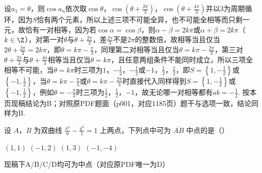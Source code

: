\begin{solution}
设\(a_{1}=\theta\)，则\(\cos a_{n}\)依次取\(\cos\theta\)，\(\cos\left(\theta+\frac{2\pi}{3}\right)\)，\(\cos\left(\theta+\frac{4\pi}{3}\right)\)并以\(3\)为周期循环，因为\(S\)恰有两个元素，所以上述三项不可能全异，也不可能全相等而只剩一元，故恰有一对相等，因为若\(\cos\alpha=\cos\beta\)，则\(\alpha-\beta=2k\pi\)或\(\alpha+\beta=2k\pi\)（\(k\in\Z\)），对第一对\(\theta\)与\(\theta+\frac{2\pi}{3}\)，差\(\frac{2\pi}{3}\)不是\(2\pi\)的整数倍，故相等当且仅当\(2\theta+\frac{2\pi}{3}=2k\pi\)，即\(\theta=k\pi-\frac{\pi}{3}\)，同理第二对相等当且仅当\(\theta=k\pi-\frac{2\pi}{3}\)，第三对\(\theta+\frac{2\pi}{3}\)与\(\theta+\frac{4\pi}{3}\)相等当且仅当\(\theta=k\pi\)，且任意两组条件不能同时成立，所以三项全相等不可能，当\(\theta=k\pi\)时三项为\(1\)，\(-\frac{1}{2}\)，\(-\frac{1}{2}\)或\(-1\)，\(\frac{1}{2}\)，\(\frac{1}{2}\)，即\(S=\left\{1,-\frac{1}{2}\right\}\)或\(\left\{-1,\frac{1}{2}\right\}\)，当\(\theta=k\pi-\frac{\pi}{3}\)或\(\theta=k\pi-\frac{2\pi}{3}\)时直接代入同样得到\(S=\left\{1,-\frac{1}{2}\right\}\)或\(\left\{-1,\frac{1}{2}\right\}\)，例如\(\theta=-\frac{\pi}{3}\)时三项为\(\frac{1}{2}\)，\(\frac{1}{2}\)，\(-1\)，故无论哪一对相等都有\(ab=-\frac{1}{2}\). 按本页现稿结论为B；对照原PDF题面（p001，对应1185页）题干与选项一致，结论同样为B.
\end{solution}

\begin{problem}
设 \(A\)，\(B\) 为双曲线 \(\frac{x^2}{9}-\frac{y^2}{1}=1\) 上两点，下列点中可为 \(\overline{AB}\) 中点的是（\quad）

\choices
    {\((1,1)\)}
    {\((-1,2)\)}
    {\((1,3)\)}
    {\((-1,-4)\)}
\end{problem}

\begin{answer}
现稿下A/B/C/D均可为中点（对应原PDF唯一为D）
\end{answer}


